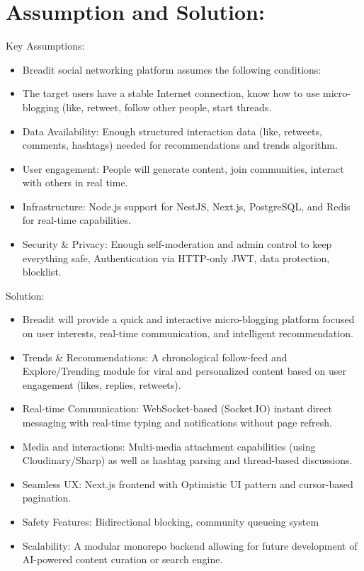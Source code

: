 \section{Assumption and Solution:}

Key Assumptions:
\begin{itemize}
  \item Breadit social networking platform assumes the following conditions:
  \item The target users have a stable Internet connection, know how to use micro-blogging (like, retweet, follow other people, start threads.
  \item Data Availability: Enough structured interaction data (like, retweets, comments, hashtags) needed for recommendations and trends algorithm.
  \item User engagement: People will generate content, join communities, interact with others in real time.
  \item Infrastructure: Node.js support for NestJS, Next.js, PostgreSQL, and Redis for real-time capabilities.
  \item Security \& Privacy: Enough self-moderation and admin control to keep everything safe, Authentication via HTTP-only JWT, data protection, blocklist.
\end{itemize}

 Solution:
\begin{itemize}
  \item Breadit will provide a quick and interactive micro-blogging platform focused on user interests, real-time communication, and intelligent recommendation.
  \item Trends \& Recommendations: A chronological follow-feed and Explore/Trending module for viral and personalized content based on user engagement (likes, replies, retweets).
  \item Real-time Communication: WebSocket-based (Socket.IO) instant direct messaging with real-time typing and notifications without page refresh.
  \item Media and interactions: Multi-media attachment capabilities (using Cloudinary/Sharp) as well as hashtag parsing and thread-based discussions.
  \item Seamless UX: Next.js frontend with Optimistic UI pattern and cursor-based pagination.
  \item Safety Features: Bidirectional blocking, community queueing system
  \item Scalability: A modular monorepo backend allowing for future development of AI-powered content curation or search engine.
\end{itemize}

